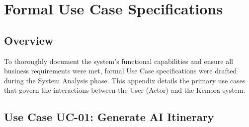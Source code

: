 \chapter{Formal Use Case Specifications}

\section{Overview}
To thoroughly document the system's functional capabilities and ensure all business requirements were met, formal Use Case specifications were drafted during the System Analysis phase. This appendix details the primary use cases that govern the interactions between the User (Actor) and the Kemora system.

\section{Use Case UC-01: Generate AI Itinerary}
